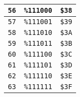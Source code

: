 \begin{multicols}{2}
\begin{center}
\begin{tabular}{|c|c|c|}
 \texttt{56} & \texttt{\%111000} &  \texttt{\$38} \\ \hline
 \texttt{57} & \texttt{\%111001} &  \texttt{\$39} \\ \hline
 \texttt{58} & \texttt{\%111010} &  \texttt{\$3A} \\ \hline
 \texttt{59} & \texttt{\%111011} &  \texttt{\$3B} \\ \hline
 \texttt{60} & \texttt{\%111100} &  \texttt{\$3C} \\ \hline
 \texttt{61} & \texttt{\%111101} &  \texttt{\$3D} \\ \hline
 \texttt{62} & \texttt{\%111110} &  \texttt{\$3E} \\ \hline
 \texttt{63} & \texttt{\%111111} &  \texttt{\$3F} \\ \hline
			\end{tabular}
		\end{center}
\end{multicols}

\vspace*{\fill}

\clearpage

\vspace*{\fill}

